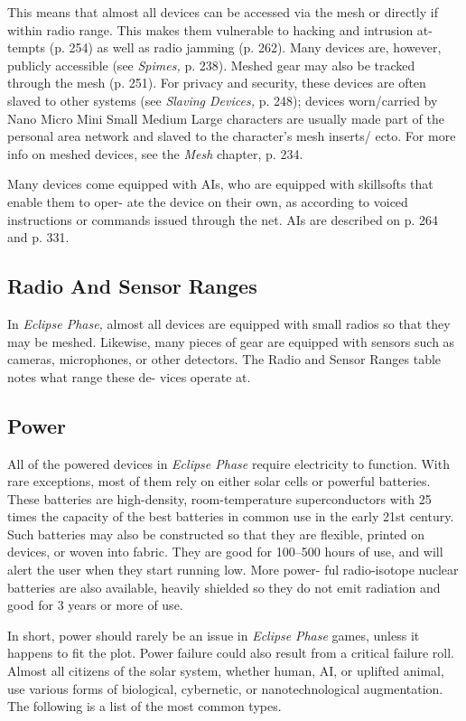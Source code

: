 This means that almost all devices can be accessed 
via the mesh or directly if within radio range. This 
makes them vulnerable to hacking and intrusion at-
tempts (p. 254) as well as radio jamming (p. 262). 
Many devices are, however, publicly accessible (see 
\textit{Spimes,} p. 238). Meshed gear may also be tracked 
through the mesh (p. 251). For privacy and security, 
these devices are often slaved to other systems (see 
\textit{Slaving Devices,} p. 248); devices worn/carried by 
Nano
Micro
Mini
Small
Medium
Large
characters are usually made part of the personal area 
network and slaved to the character's mesh inserts/
ecto. For more info on meshed devices, see the \textit{Mesh}
chapter, p. 234.

Many devices come equipped with AIs, who are 
equipped with skillsofts that enable them to oper-
ate the device on their own, as according to voiced 
instructions or commands issued through the net. AIs 
are described on p. 264 and p. 331.

\subsection{Radio And Sensor Ranges}

In \textit{Eclipse Phase,} almost all devices are equipped with 
small radios so that they may be meshed. Likewise, 
many pieces of gear are equipped with sensors such as 
cameras, microphones, or other detectors. The Radio 
and Sensor Ranges table notes what range these de-
vices operate at.

\subsection{Power}

All of the powered devices in \textit{Eclipse Phase} require 
electricity to function. With rare exceptions, most of 
them rely on either solar cells or powerful batteries. 
These batteries are high-density, room-temperature 
superconductors with 25 times the capacity of the 
best batteries in common use in the early 21st century. 
Such batteries may also be constructed so that they 
are flexible, printed on devices, or woven into fabric. 
They are good for 100–500 hours of use, and will alert 
the user when they start running low. More power-
ful radio-isotope nuclear batteries are also available, 
heavily shielded so they do not emit radiation and 
good for 3 years or more of use.

In short, power should rarely be an issue in \textit{Eclipse }
\textit{Phase} games, unless it happens to fit the plot. Power 
failure could also result from a critical failure roll.
Almost all citizens of the solar system, whether human, 
AI, or uplifted animal, use various forms of biological, 
cybernetic, or nanotechnological augmentation. The 
following is a list of the most common types.

